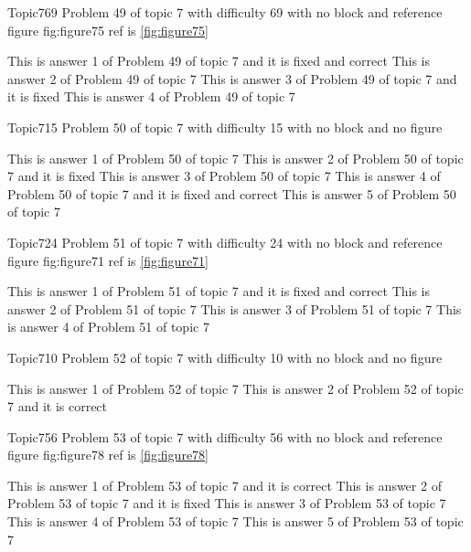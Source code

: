 \documentclass[master]{exam}
\begin{document}
\begin{problem}{Topic7}{69}
	Problem 49 of topic 7 with difficulty 69 with no block and reference figure fig:figure75 ref is \ref{fig:figure75}
	\begin{answers}
		 This is answer 1 of Problem 49 of topic 7 and it is fixed and correct
		\answer This is answer 2 of Problem 49 of topic 7 
		\answer[fixed] This is answer 3 of Problem 49 of topic 7 and it is fixed
		\answer This is answer 4 of Problem 49 of topic 7 
	\end{answers}
\end{problem}

\begin{problem}{Topic7}{15}
	Problem 50 of topic 7 with difficulty 15 with no block and no figure
	\begin{answers}
		\answer This is answer 1 of Problem 50 of topic 7 
		\answer[fixed] This is answer 2 of Problem 50 of topic 7 and it is fixed
		\answer This is answer 3 of Problem 50 of topic 7 
		 This is answer 4 of Problem 50 of topic 7 and it is fixed and correct
		\answer This is answer 5 of Problem 50 of topic 7 
	\end{answers}
\end{problem}

\begin{problem}{Topic7}{24}
	Problem 51 of topic 7 with difficulty 24 with no block and reference figure fig:figure71 ref is \ref{fig:figure71}
	\begin{answers}
		 This is answer 1 of Problem 51 of topic 7 and it is fixed and correct
		\answer This is answer 2 of Problem 51 of topic 7 
		\answer This is answer 3 of Problem 51 of topic 7 
		\answer This is answer 4 of Problem 51 of topic 7 
	\end{answers}
\end{problem}

\begin{problem}{Topic7}{10}
	Problem 52 of topic 7 with difficulty 10 with no block and no figure
	\begin{answers}
		\answer This is answer 1 of Problem 52 of topic 7 
		\answer[correct] This is answer 2 of Problem 52 of topic 7 and it is correct
	\end{answers}
\end{problem}

\begin{problem}{Topic7}{56}
	Problem 53 of topic 7 with difficulty 56 with no block and reference figure fig:figure78 ref is \ref{fig:figure78}
	\begin{answers}
		\answer[correct] This is answer 1 of Problem 53 of topic 7 and it is correct
		\answer[fixed] This is answer 2 of Problem 53 of topic 7 and it is fixed
		\answer This is answer 3 of Problem 53 of topic 7 
		\answer This is answer 4 of Problem 53 of topic 7 
		\answer This is answer 5 of Problem 53 of topic 7 
	\end{answers}
\end{problem}
\end{document}
